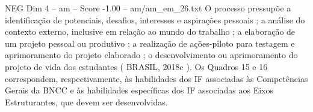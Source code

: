 \begin{textsample}{NEG Dim 4 – am – Score -1.00 – am/am\_em\_26.txt}
O processo pressupõe a identificação de potenciais, desafios, interesses e aspirações pessoais ; a análise do contexto externo, inclusive em relação ao mundo do trabalho ; a elaboração de um projeto pessoal ou produtivo ; a realização de ações-piloto para testagem e aprimoramento do projeto elaborado ; o desenvolvimento ou aprimoramento do projeto de vida dos estudantes ( BRASIL, 2018c ).
Os Quadros 15 e 16 correspondem, respectivamente, às habilidades dos IF associadas às Competências Gerais da BNCC e às habilidades específicas dos IF associadas aos Eixos Estruturantes, que devem ser desenvolvidas.

\end{textsample}
